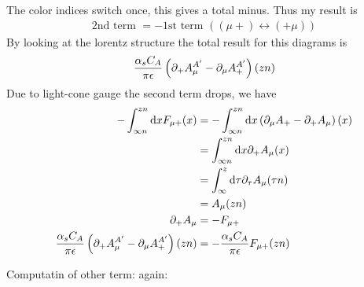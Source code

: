 The color indices switch once, this gives a total minus. Thus my result is
\begin{align}
	\text{2nd term } = -\text{1st term }((\mu +) \leftrightarrow(+\mu) ) 
\end{align}
By looking at the lorentz structure the total result for this diagrams is 
\begin{align}
	\frac{ \alpha_s  C_A}{\pi\epsilon}  \left(\partial_+ A_\mu^{A'}-\partial_\mu A_+^{A'}\right)(zn)
\end{align}
Due to light-cone gauge the second term drops, we have
\begin{align}
	- \int_{\-\infty n} ^{zn} \text{d} x F_{\mu +}(x) 
	&= - \int_{\-\infty n} ^{zn} \text{d} x \left(\partial_\mu A_+ - \partial_+ A_\mu \right)(x)
	\\
	&=\int_{\-\infty n} ^{zn} \text{d} x  \partial_+ A_\mu(x)
	\\
	&=
	\int_{\-\infty} ^{z} \text{d} \tau  \partial_\tau A_\mu(\tau n)
	\\
	&=
	A_\mu (zn)
	\\
	\partial_+A_\mu 
	&=
	-F_{\mu +}
	\\
	\frac{ \alpha_s  C_A}{\pi\epsilon}  \left(\partial_+ A_\mu^{A'}-\partial_\mu A_+^{A'}\right)(zn)
	&=	
	-\frac{ \alpha_s  C_A}{\pi\epsilon}  F_{\mu +}(zn)
\end{align}

Computatin of other term: again:

